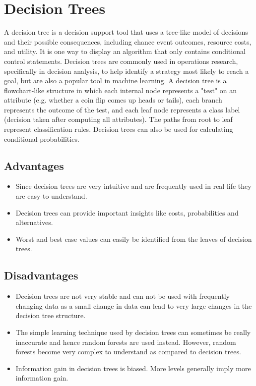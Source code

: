 \documentclass[12pt, a4paper]{report}
\begin{document}
\section{Decision Trees}

A decision tree is a decision support tool that uses a tree-like model of decisions and their possible consequences, including chance event outcomes, resource costs, and utility. It is one way to display an algorithm that only contains conditional control statements. Decision trees are commonly used in operations research, specifically in decision analysis, to help identify a strategy most likely to reach a goal, but are also a popular tool in machine learning. \cite{decisiontreesone}
A decision tree is a flowchart-like structure in which each internal node represents a "test" on an attribute (e.g. whether a coin flip comes up heads or tails), each branch represents the outcome of the test, and each leaf node represents a class label (decision taken after computing all attributes). The paths from root to leaf represent classification rules. Decision trees can also be used for calculating conditional probabilities.

\subsection{Advantages}
\begin{itemize}
\item Since decision trees are very intuitive and are frequently used in real life they are easy to understand.
\item Decision trees can provide important insights like costs, probabilities and alternatives.
\item Worst and best case values can easily be identified from the leaves of decision trees.
\end{itemize}

\subsection{Disadvantages}
\begin{itemize}
\item Decision trees are not very stable and can not be used with frequently changing data as a small change in data can lead to very large changes in the decision tree structure.
\item The simple learning technique used by decision trees can sometimes be really inaccurate and hence random forests are used instead. However, random forests become very complex to understand as compared to decision trees.
\item Information gain in decision trees is biased. More levels generally imply more information gain. 
\end{itemize}
\end{document}

